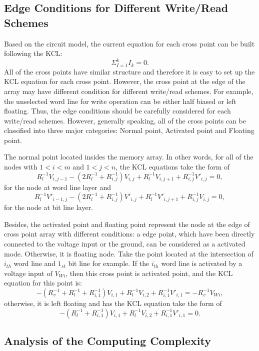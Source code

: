 \subsection{Edge Conditions for Different Write/Read Schemes}
Based on the circuit model, the current equation for each cross point can be built following the KCL:
\begin{equation}
  {\Sigma}_{I=1}^kI_k=0.
\end{equation}
All of the cross points have similar structure and therefore it is easy to set up the KCL equation for each cross point. However, the cross point at the edge of the array may have different condition for different write/read schemes. For example, the unselected word line for write operation can be either half biased or left floating. Thus, the edge conditions should be carefully considered for each write/read schemes. However, generally speaking, all of the cross points can be classified into three major categories: Normal point, Activated point and Floating point.

The normal point located insides the memory array. In other words, for all of the nodes with $1<i<m$ and $1<j<n$, the KCL equations take the form of
\begin{equation}
R_l^{-1}V_{i,j-1} -(2R_l^{-1}+R_{i,j}^{-1})V_{i,j}+ R_l^{-1}V_{i,j+1}+R_{i,j}^{-1}V'_{i,j}=0,
\end{equation}
for the node at word line layer and
\begin{equation}
R_l^{-1}V'_{i-1,j} -(2R_l^{-1}+R_{i,j}^{-1})V'_{i,j}+ R_l^{-1}V'_{i,j+1}+R_{i,j}^{-1}V_{i,j}=0,
\end{equation}
for the node at bit line layer.

Besides, the activated point and floating point represent the node at the edge of cross point array with different conditions: a edge point, which have been directly connected to the voltage input or the ground, can be considered as a activated mode. Otherwise, it is floating node. Take the point located at the intersection of $i_{th}$ word line and $1_{st}$ bit line for example. If the $i_{th}$ word line is activated by a voltage input of $V_{Wi}$, then this cross point is activated point, and the KCL equation for this point is:
\begin{equation}
-(R_v^{-1}+R_l^{-1}+R_{i,1}^{-1})V_{i,1}+ R_l^{-1}V_{i,2}+R_{i,1}^{-1}V'_{i,1}=-R_v^{-1}V_{Wi},
\end{equation}
otherwise, it is left floating and has the KCL equation take the form of
\begin{equation}
-(R_l^{-1}+R_{i,1}^{-1})V_{i,1}+ R_l^{-1}V_{i,2}+R_{i,1}^{-1}V'_{i,1}=0.
\end{equation}

\subsection{Analysis of the Computing Complexity}
